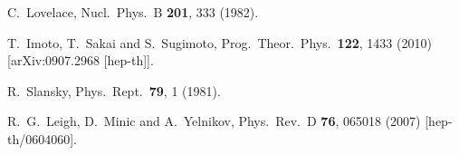 \documentclass[prl,aps,
showpacs,
preprint,
nofootinbib,
floatfix,
superscriptaddress, showkeys
]{revtex4-1}
\begin{document}
\begin{thebibliography}{99}
    
  C.~Lovelace,
  Nucl.\ Phys.\ B {\bf 201}, 333 (1982).
  
  T.~Imoto, T.~Sakai and S.~Sugimoto,
  Prog.\ Theor.\ Phys.\  {\bf 122}, 1433 (2010)
  [arXiv:0907.2968 [hep-th]].

  R.~Slansky,
  Phys.\ Rept.\  {\bf 79}, 1 (1981).

  R.~G.~Leigh, D.~Minic and A.~Yelnikov,
  Phys.\ Rev.\ D {\bf 76}, 065018 (2007)
  [hep-th/0604060].
  

\end{thebibliography}
\end{document}
